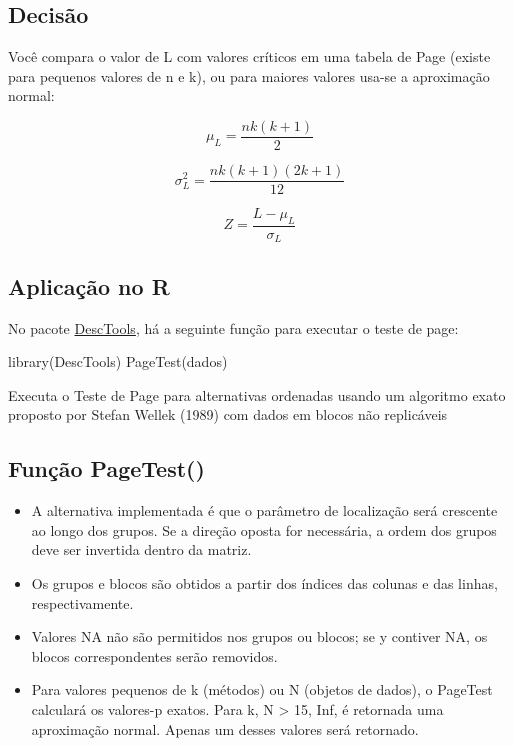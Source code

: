 \documentclass[
  letterpaper,
  DIV=11,
  numbers=noendperiod]{scrartcl}
\newenvironment{Shaded}{\begin{snugshade}}{\end{snugshade}}
\newcommand{\FunctionTok}[1]{\textcolor[rgb]{0.28,0.35,0.67}{#1}}
\newcommand{\NormalTok}[1]{\textcolor[rgb]{0.00,0.23,0.31}{#1}}
\begin{document}
\subsection{Decisão}\label{decisuxe3o}

Você compara o valor de L com valores críticos em uma tabela de Page
(existe para pequenos valores de n e k), ou para maiores valores usa-se
a aproximação normal:

\[
\mu_L = \frac{n k (k+1)}{2}
\]

\[
\sigma_L^2 = \frac{n k (k+1)(2k+1)}{12}
\]

\[
Z = \frac{L - \mu_L}{\sigma_L}
\]

\subsection{Aplicação no R}\label{aplicauxe7uxe3o-no-r}

No pacote
\href{https://cran.r-project.org/web/packages/DescTools/DescTools.pdf}{DescTools},
há a seguinte função para executar o teste de page:

\begin{Shaded}
\begin{Highlighting}[]
\FunctionTok{library}\NormalTok{(DescTools)}
\FunctionTok{PageTest}\NormalTok{(dados)}
\end{Highlighting}
\end{Shaded}

Executa o Teste de Page para alternativas ordenadas usando um algoritmo
exato proposto por Stefan Wellek (1989) com dados em blocos não
replicáveis

\subsection{Função PageTest()}\label{funuxe7uxe3o-pagetest}

\begin{itemize}
\item
  A alternativa implementada é que o parâmetro de localização será
  crescente ao longo dos grupos. Se a direção oposta for necessária, a
  ordem dos grupos deve ser invertida dentro da matriz.
\item
  Os grupos e blocos são obtidos a partir dos índices das colunas e das
  linhas, respectivamente.
\item
  Valores NA não são permitidos nos grupos ou blocos; se y contiver NA,
  os blocos correspondentes serão removidos.
\item
  Para valores pequenos de k (métodos) ou N (objetos de dados), o
  PageTest calculará os valores-p exatos. Para k, N \textgreater{} 15,
  Inf, é retornada uma aproximação normal. Apenas um desses valores será
  retornado.
\end{itemize}
\end{document}
